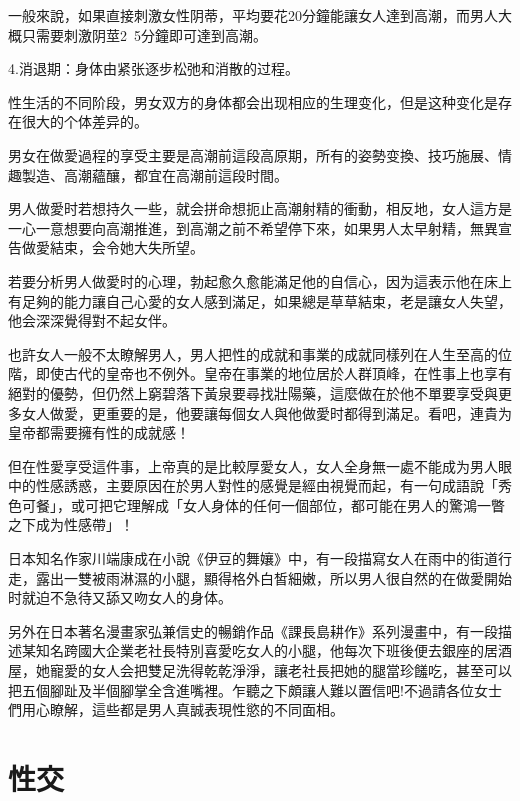 \documentclass[12pt,UTF8]{ctexbook}
\begin{document}
一般來說，如果直接刺激女性阴蒂，平均要花20分鐘能讓女人達到高潮，而男人大概只需要刺激阴莖2~5分鐘即可達到高潮。

4.消退期：身体由紧张逐步松弛和消散的过程。

性生活的不同阶段，男女双方的身体都会出现相应的生理变化，但是这种变化是存在很大的个体差异的。

男女在做愛過程的享受主要是高潮前這段高原期，所有的姿勢变換、技巧施展、情趣製造、高潮蘊釀，都宜在高潮前這段时間。

男人做愛时若想持久一些，就会拼命想扼止高潮射精的衝動，相反地，女人這方是一心一意想要向高潮推進，到高潮之前不希望停下來，如果男人太早射精，無異宣告做愛結束，会令她大失所望。

若要分析男人做愛时的心理，勃起愈久愈能滿足他的自信心，因为這表示他在床上有足夠的能力讓自己心愛的女人感到滿足，如果總是草草結束，老是讓女人失望，他会深深覺得對不起女伴。

也許女人一般不太瞭解男人，男人把性的成就和事業的成就同樣列在人生至高的位階，即使古代的皇帝也不例外。皇帝在事業的地位居於人群頂峰，在性事上也享有絕對的優勢，但仍然上窮碧落下黃泉要尋找壯陽藥，這麼做在於他不單要享受與更多女人做愛，更重要的是，他要讓每個女人與他做愛时都得到滿足。看吧，連貴为皇帝都需要擁有性的成就感！

但在性愛享受這件事，上帝真的是比較厚愛女人，女人全身無一處不能成为男人眼中的性感誘惑，主要原因在於男人對性的感覺是經由視覺而起，有一句成語說「秀色可餐」，或可把它理解成「女人身体的任何一個部位，都可能在男人的驚鴻一瞥之下成为性感帶」！

日本知名作家川端康成在小說《伊豆的舞孃》中，有一段描寫女人在雨中的街道行走，露出一雙被雨淋濕的小腿，顯得格外白皙細嫩，所以男人很自然的在做愛開始时就迫不急待又舔又吻女人的身体。

另外在日本著名漫畫家弘兼信史的暢銷作品《課長島耕作》系列漫畫中，有一段描述某知名跨國大企業老社長特別喜愛吃女人的小腿，他每次下班後便去銀座的居酒屋，她寵愛的女人会把雙足洗得乾乾淨淨，讓老社長把她的腿當珍饈吃，甚至可以把五個腳趾及半個腳掌全含進嘴裡。乍聽之下頗讓人難以置信吧!不過請各位女士們用心瞭解，這些都是男人真誠表現性慾的不同面相。

\part{性交}
\end{document}
